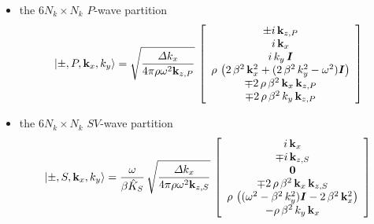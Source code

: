 \begin{itemize}
\item the $6 N_k \times N_k$ $P$-wave partition
\begin{equation} \label{PeigenSuper}
\left|\pm,P, {\bf k}_x,k_{y}  \right\rangle=
\sqrt{\frac{{\mit \Delta} k_{x}}{{4 \pi \rho {\omega 
}^{  2}{\bf  k}_{  
z, P }}}}\,\left[\begin{array}{c} \pm i\,{\bf k}_{z,P}\\i\,{\bf k}_{x}\\
i\,k_{y}\,{\mbox{\boldmath$\mit I$\unboldmath}}\\
  \rho \,\left( 2\,{\beta^2}\,{{\bf k}_{x}^2} + ( 2\,{\beta^2}\,{k_{y}^2} - 
     {\omega^2}){\mbox{\boldmath$\mit I$\unboldmath}} \right) \\ \mp 2\,\rho\,{\beta^2}\,{\bf k}_{x}\,{\bf k}_{z,P} \\
  \mp 2\,\rho\,{\beta^2}\,k_{y}\,{\bf k}_{z,P} \end{array}\right]
\end{equation}

\item  the $6 N_k \times N_k$ $SV$-wave partition
\begin{equation} \label{SVeigenSuper}
\left|\pm,S, {\bf k}_x,k_{y}  \right\rangle=\frac{\omega }{\beta \hat{K}_{S}}\,
\sqrt{\frac{{\mit \Delta} k_{x}}{{4 \pi \rho {\omega 
}^{  2}{\bf  k}_{  
z, S }}}}\,\left[\begin{array}{c} 
i\,{\bf k}_{x}\\
\mp i\,{\bf k}_{z,S}\\ {\bf 0} \\
\mp 2\,\rho\,{\beta^2}\,{\bf k}_{x}\,{\bf k}_{z,S} \\
  \rho \,\left(({\omega^2} - {\beta^2}\,{k_{y}^2}) {\mbox{\boldmath$\mit I$\unboldmath}}-2\,{\beta^2}\,{{\bf k}_{x}^2}   \right) \\
  -\rho\,{\beta^2}\,k_{y}\,{\bf k}_{x} \end{array}\right]
\end{equation}


\end{itemize}
